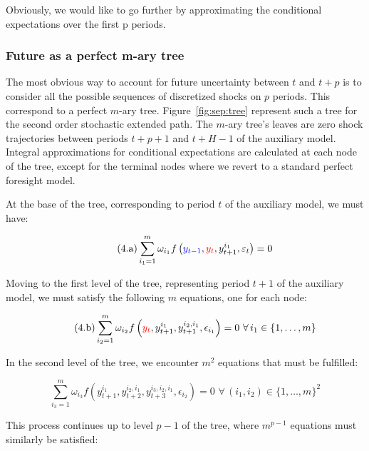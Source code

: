\documentclass[a4paper,11pt]{amsart}
\begin{document}
Obviously, we would like to go further by approximating the
conditional expectations over the first p periods.\newline

\subsubsection{Future as a perfect m-ary tree}\label{sec:perfect-m-ary-tree} The most obvious way to
account for future uncertainty between $t$ and $t+p$ is to consider
all the possible sequences of discretized shocks on $p$ periods. This
correspond to a perfect $m$-ary tree. Figure~\ref{fig:sep:tree}
represent such a tree for the second order stochastic extended
path. The $m$-ary tree's leaves are zero shock trajectories between
periods $t+p+1$ and $t+H-1$ of the auxiliary model. Integral
approximations for conditional expectations are calculated at each
node of the tree, except for the terminal nodes where we revert to a
standard perfect foresight model.\newline

At the base of the tree, corresponding to period \( t \) of the auxiliary model, we must have:

\begin{equation}\label{sep:perfect:0}\tag{4.a}
   \sum_{i_1=1}^m \omega_{i_1} f\left({\color{blue}y_{t-1}}, {\color{red}y_t}, y_{t+1}^{i_1}, \varepsilon_t \right) = 0
\end{equation}

Moving to the first level of the tree, representing period \( t+1 \) of the auxiliary model, we must satisfy the following \( m \) equations, one for each node:

\begin{equation}\label{sep:perfect:1}\tag{4.b}
   \sum_{i_2=1}^m \omega_{i_2} f\left({\color{red}y_{t}}, y_{t+1}^{i_1}, y_{t+1}^{i_2,i_1}, \epsilon_{i_1} \right) = 0\,\, \forall\, i_1\in \{1,\dots,m\}
\end{equation}

In the second level of the tree, we encounter \( m^2 \) equations that must be fulfilled:

\begin{equation}\label{sep:perfect:2}\tag{4.c}
   \sum_{i_3=1}^m \omega_{i_3} f\left(y_{t+1}^{i_1}, y_{t+2}^{i_2, i_1}, y_{t+3}^{i_3,i_2,i_1}, \epsilon_{i_2} \right) = 0\,\,  \forall\, (i_1,i_2)\in \{1,\dots,m\}^2
\end{equation}

This process continues up to level \(p-1\) of the tree, where \(m^{p-1}\) equations must similarly be satisfied:
\end{document}
